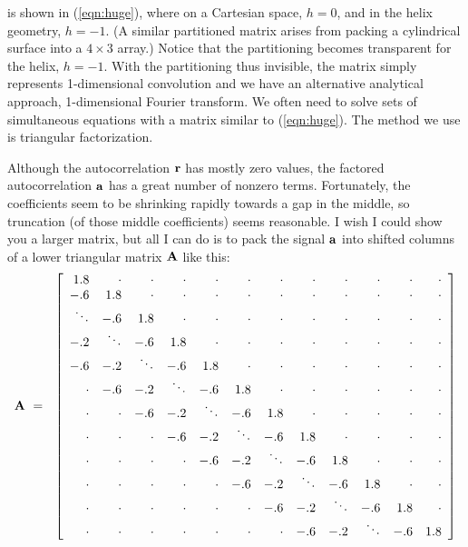 is shown in (\ref{eqn:huge}),
where 
on a Cartesian space, $h=0$,
and in the helix geometry, $h=-1$.
(A similar partitioned matrix arises from packing
a cylindrical surface into a $4\times3$ array.)
Notice that the partitioning becomes transparent for the helix, $h=-1$.
With the partitioning thus invisible, the matrix
simply represents 1-dimensional convolution
and we have an alternative analytical approach,
1-dimensional Fourier transform.
We often need to solve sets of simultaneous equations
with a matrix similar to (\ref{eqn:huge}).
The method we use is triangular factorization.
\par
Although the autocorrelation $\bold r$ has mostly zero values,
the factored autocorrelation $\bold a$ has a great number of nonzero terms.
Fortunately, 
the coefficients seem to be shrinking rapidly towards a gap in the middle,
so truncation (of those middle coefficients) seems reasonable.
I wish I could show you a larger matrix, but all I can do is to pack
the signal $\bold a$ into shifted columns of
a lower triangular matrix $\bold A$ like this:
\begin{equation}
\bold A \ = \ \ 
\left[
\begin{array}{rrrrrrrrrrrr}
   1.8& \cdot& \cdot& \cdot& \cdot& \cdot& \cdot& \cdot& \cdot& \cdot& \cdot& \cdot\\
   -.6&   1.8& \cdot& \cdot& \cdot& \cdot& \cdot& \cdot& \cdot& \cdot& \cdot& \cdot\\
\ddots&   -.6&   1.8& \cdot& \cdot& \cdot& \cdot& \cdot& \cdot& \cdot& \cdot& \cdot\\
   -.2&\ddots&   -.6&   1.8& \cdot& \cdot& \cdot& \cdot& \cdot& \cdot& \cdot& \cdot\\
   -.6&   -.2&\ddots&   -.6&   1.8& \cdot& \cdot& \cdot& \cdot& \cdot& \cdot& \cdot\\
 \cdot&   -.6&   -.2&\ddots&   -.6&   1.8& \cdot& \cdot& \cdot& \cdot& \cdot& \cdot\\
 \cdot& \cdot&   -.6&   -.2&  \ddots& -.6&   1.8& \cdot& \cdot& \cdot& \cdot& \cdot\\
 \cdot& \cdot& \cdot&   -.6&  -.2& \ddots&   -.6&   1.8& \cdot& \cdot& \cdot& \cdot\\
 \cdot& \cdot& \cdot& \cdot&  -.6&    -.2&\ddots&   -.6&   1.8& \cdot& \cdot& \cdot\\
 \cdot& \cdot& \cdot& \cdot& \cdot&   -.6&   -.2&\ddots&   -.6&   1.8& \cdot& \cdot\\
 \cdot& \cdot& \cdot& \cdot& \cdot& \cdot&   -.6&   -.2&\ddots&   -.6&   1.8& \cdot\\
 \cdot& \cdot& \cdot& \cdot& \cdot& \cdot& \cdot&   -.6&   -.2&\ddots&   -.6&  1.8
\end{array}
\right]
\label{eqn:lapfacmat}
\end{equation}
